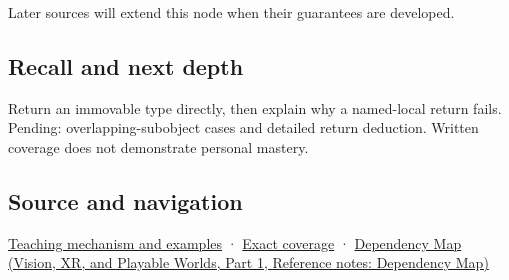 \hypertarget{appendix-b08d3788c5c6-used-by}{}

Later sources will extend this node when their guarantees are developed.

\subsection{Recall and next depth}\label{appendix-b08d3788c5c6-recall-and-next-depth}

\hypertarget{appendix-b08d3788c5c6-recall-and-next-depth}{}

Return an immovable type directly, then explain why a named-local return fails. Pending: overlapping-subobject cases and detailed return deduction. Written coverage does not demonstrate personal mastery.

\subsection{Source and navigation}\label{appendix-b08d3788c5c6-source-and-navigation}

\hypertarget{appendix-b08d3788c5c6-source-and-navigation}{}

\hyperref[01-foundations-i-ch003-return-a-result-without-handing-out-a-lifetime-problem]{Teaching mechanism and examples} · \hyperref[appendix-fd090d982a15-m009---parts-127-147]{Exact coverage} · \href{../07-Vision-XR-and-Playable-Worlds-P01/main.pdf\#appendix-4ad47bdd269a}{Dependency Map (Vision, XR, and Playable Worlds, Part 1, Reference notes: Dependency Map)}

